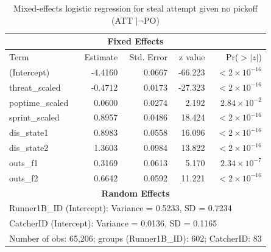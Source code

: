 \documentclass[12pt,letterpaper]{article}
\begin{document}
\begin{table}[htbp]
\centering
\caption{Mixed-effects logistic regression for steal attempt given no pickoff (ATT $\mid \neg$PO)}
\label{tab:att_no_po}
\begin{tabular}{lrrrr}
\toprule
\multicolumn{5}{c}{\textbf{Fixed Effects}} \\
\midrule
Term & Estimate & Std. Error & z value & Pr($>|z|$) \\
\midrule
(Intercept)        & -4.4160 & 0.0667 & -66.223 & $< 2\times10^{-16}$ \\
threat\_scaled     & -0.4712 & 0.0173 & -27.323 & $< 2\times10^{-16}$ \\
poptime\_scaled    &  0.0600 & 0.0274 &   2.192 & $2.84\times10^{-2}$ \\
sprint\_scaled     &  0.8957 & 0.0486 &  18.424 & $< 2\times10^{-16}$ \\
dis\_state1        &  0.8983 & 0.0558 &  16.096 & $< 2\times10^{-16}$ \\
dis\_state2        &  1.3603 & 0.0984 &  13.822 & $< 2\times10^{-16}$ \\
outs\_f1           &  0.3169 & 0.0613 &   5.170 & $2.34\times10^{-7}$ \\
outs\_f2           &  0.6642 & 0.0592 &  11.221 & $< 2\times10^{-16}$ \\
\midrule
\multicolumn{5}{c}{\textbf{Random Effects}} \\
\midrule
\multicolumn{5}{l}{Runner1B\_ID (Intercept): Variance = 0.5233, SD = 0.7234} \\
\multicolumn{5}{l}{CatcherID (Intercept): Variance = 0.0136, SD = 0.1165} \\
\multicolumn{5}{l}{Number of obs: 65,206; groups (Runner1B\_ID): 602; CatcherID: 83} \\
\bottomrule
\end{tabular}
\end{table}
\end{document}
